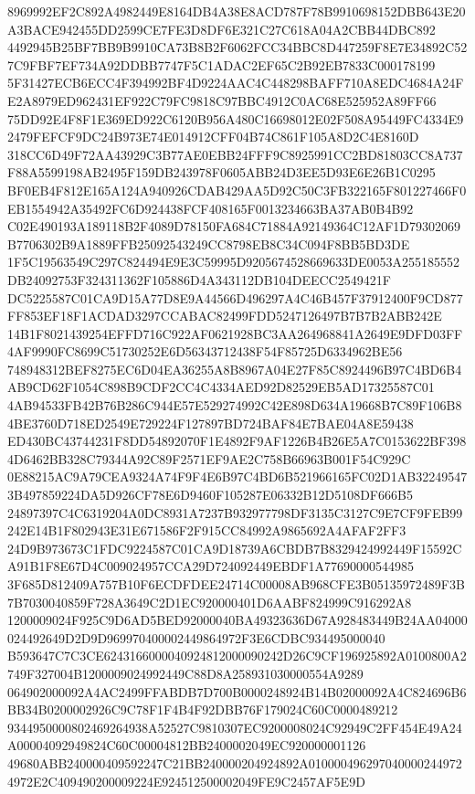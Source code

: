 \documentclass[UTF8,fontset=fandol,zihao=-4,a4paper]{ctexart}
\begin{document}
{{8969992EF2C892A4982449E8164DB4A38E8ACD787F78B9910698152DBB643E20A3BACE942455DD2599CE7FE3D8DF6E321C27C618A04A2CBB44DBC892
4492945B25BF7BB9B9910CA73B8B2F6062FCC34BBC8D447259F8E7E34892C527C9FBF7EF734A92DDBB7747F5C1ADAC2EF65C2B92EB7833C000178199
5F31427ECB6ECC4F394992BF4D9224AAC4C448298BAFF710A8EDC4684A24FE2A8979ED962431EF922C79FC9818C97BBC4912C0AC68E525952A89FF66
75DD92E4F8F1E369ED922C6120B956A480C16698012E02F508A95449FC4334E92479FEFCF9DC24B973E74E014912CFF04B74C861F105A8D2C4E8160D
318CC6D49F72AA43929C3B77AE0EBB24FFF9C8925991CC2BD81803CC8A737F88A5599198AB2495F159DB243978F0605ABB24D3EE5D93E6E26B1C0295
BF0EB4F812E165A124A940926CDAB429AA5D92C50C3FB322165F801227466F0EB1554942A35492FC6D924438FCF408165F0013234663BA37AB0B4B92
C02E490193A189118B2F4089D78150FA684C71884A92149364C12AF1D79302069B7706302B9A1889FFB25092543249CC8798EB8C34C094F8BB5BD3DE
1F5C19563549C297C824494E9E3C59995D9205674528669633DE0053A255185552DB24092753F324311362F105886D4A343112DB104DEECC2549421F
DC5225587C01CA9D15A77D8E9A44566D496297A4C46B457F37912400F9CD877FF853EF18F1ACDAD3297CCABAC82499FDD5247126497B7B7B2ABB242E
14B1F8021439254EFFD716C922AF0621928BC3AA264968841A2649E9DFD03FF4AF9990FC8699C51730252E6D56343712438F54F85725D6334962BE56
748948312BEF8275EC6D04EA36255A8B8967A04E27F85C8924496B97C4BD6B4AB9CD62F1054C898B9CDF2CC4C4334AED92D82529EB5AD17325587C01
4AB94533FB42B76B286C944E57E529274992C42E898D634A19668B7C89F106B84BE3760D718ED2549E729224F127897BD724BAF84E7BAE04A8E59438
ED430BC43744231F8DD54892070F1E4892F9AF1226B4B26E5A7C0153622BF3984D6462BB328C79344A92C89F2571EF9AE2C758B66963B001F54C929C
0E88215AC9A79CEA9324A74F9F4E6B97C4BD6B521966165FC02D1AB322495473B497859224DA5D926CF78E6D9460F105287E06332B12D5108DF666B5
24897397C4C6319204A0DC8931A7237B932977798DF3135C3127C9E7CF9FEB99242E14B1F802943E31E671586F2F915CC84992A9865692A4AFAF2FF3
24D9B973673C1FDC9224587C01CA9D18739A6CBDB7B8329424992449F15592CA91B1F8E67D4C009024957CCA29D724092449EBDF1A77690000544985
3F685D812409A757B10F6ECDFDEE24714C00008AB968CFE3B05135972489F3B7B7030040859F728A3649C2D1EC920000401D6AABF824999C916292A8
1200009024F925C9D6AD5BED92000040BA49323636D67A928483449B24AA04000024492649D2D9D969970400002449864972F3E6CDBC934495000040
B593647C7C3CE6243166000040924812000090242D26C9CF196925892A0100800A2749F327004B1200009024992449C88D8A258931030000554A9289
064902000092A4AC2499FFABDB7D700B0000248924B14B02000092A4C824696B6BB34B0200002926C9C78F1F4B4F92DBB76F179024C60C0000489212
9344950000802469264938A52527C9810307EC9200008024C92949C2FF454E49A24A00004092949824C60C00004812BB2400002049EC920000001126
49680ABB240000409592247C21BB240000204924892A0100004962970400002449724972E2C409490200009224E924512500002049FE9C2457AF5E9D
}}
\end{document}

